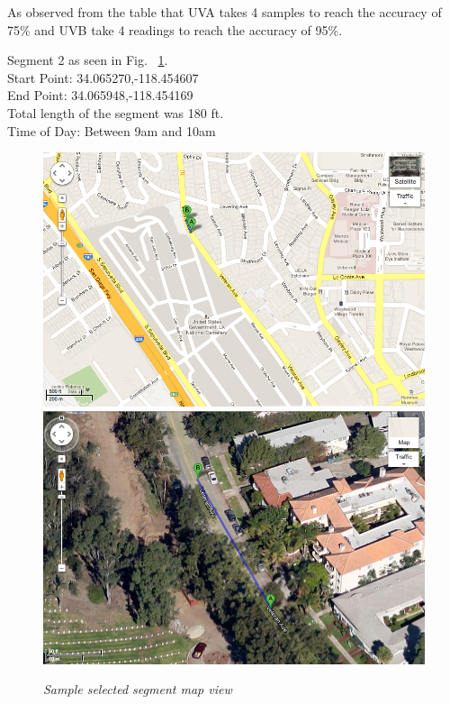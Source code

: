 \documentclass[12pt,fullpage,doublespace]{article}
\begin{document}
As observed from the table that UVA takes 4 samples to reach the accuracy of 75\% and UVB take 4 readings to reach the accuracy of 95\%. 
\newpage


\newpage
\begin{center}
Segment 2 as seen in Fig. ~\ref{fig:segment2}. \\
Start Point:  34.065270,-118.454607\\
End Point:  34.065948,-118.454169\\
Total length of the segment was 180 ft.\\
Time of Day: Between 9am and 10am\\
\begin{figure}[h]
\begin{center}
\includegraphics[scale=0.32]{segment2a.png}
\includegraphics[scale=0.32]{segment2b.png}
\caption{\small \sl Sample selected segment map view}\label{fig:segment2}
\end{center}
\end{figure}
\end{center}
\end{document}
